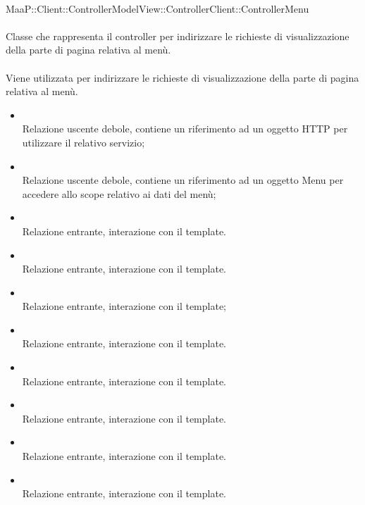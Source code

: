 	\\
	MaaP::Client::ControllerModelView::ControllerClient::ControllerMenu\\
	\\
	Classe che rappresenta il controller per indirizzare le richieste di visualizzazione della parte di pagina relativa al menù.\\
	\\
	Viene utilizzata per indirizzare le richieste di visualizzazione della parte di pagina relativa al menù.\\
	\begin{itemize}
	\item{}\\
	Relazione uscente debole, contiene un riferimento ad un oggetto HTTP per utilizzare il relativo servizio;
	\item{}\\
	Relazione uscente debole, contiene un riferimento ad un oggetto Menu per accedere allo scope relativo ai dati del menù;
	\item{}\\
	Relazione entrante, interazione con il template.
	\item{}\\
	Relazione entrante, interazione con il template.
	\item{}\\
	Relazione entrante, interazione con il template;
	\item{}\\
	Relazione entrante, interazione con il template.
	\item{}\\
	Relazione entrante, interazione con il template.
	\item{}\\
	Relazione entrante, interazione con il template.
	\item{}\\
	Relazione entrante, interazione con il template.
	\item{}\\
	Relazione entrante, interazione con il template.
	\end{itemize}

